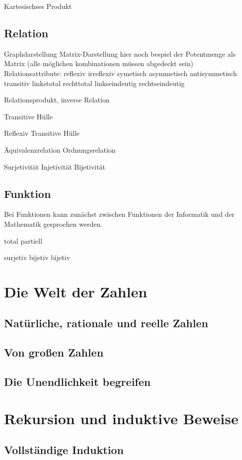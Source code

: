 Kartesischses Produkt

\subsection{Relation}

Graphdarstellung
Matrix-Darstellung hier noch bespiel der Potentmenge als Matrix (alle möglichen kombinationen müssen abgedeckt sein)\\


Relationsattribute:
reflexiv
irreflexiv
symetisch
asymmetisch
antisymmetisch
transitiv
linkstotal
rechttotal
linkseindeutig
rechtseindeutig

Relationsprodukt, inverse Relation

Transitive Hülle

Reflexiv Transitive Hülle

Äquivalenzrelation
Ordnungsrelation


Surjetivität
Injetivität
Bijetivität


\subsection{Funktion}

Bei Funktionen kann zunächst zwischen Funktionen der Informatik und der Mathematik gesprochen werden. 

total 
partiell

surjetiv
bijetiv
bijetiv


\section{Die Welt der Zahlen}
\subsection{Natürliche, rationale und reelle Zahlen}
\subsection{Von großen Zahlen}
\subsection{Die Unendlichkeit begreifen}

\section{Rekursion und induktive Beweise}
\subsection{Vollständige Induktion}





